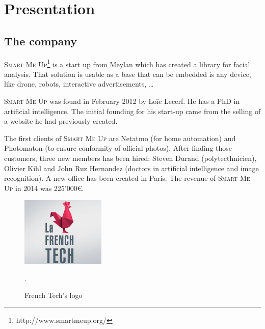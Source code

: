 \documentclass[a4paper,11pt]{custom}
\newcommand{\smu}{\textsc{Smart Me Up}\xspace}
\begin{document}
\newpage

%
\headerleftcontent{\headerlefttext}%
\headerrightcontent{\headerrighttext}%

\tableofcontents

\clearpage

\chapter{Presentation}


\section{The company}

\smu{}\footnote{http://www.smartmeup.org/} is a start up from Meylan which has
created a library for facial
analysis. That solution is usable as a base that can be embedded is any device,
like drone, robots, interactive advertisements, …

\smu{} was found in February 2012 by Loïc Lecerf. He has a PhD in artificial
intelligence. The initial founding for his start-up came from the selling of
a website he had previously created.

The first clients of \smu{} are Netatmo (for home automation) and Photomaton (to
ensure conformity of official photos). After finding those customers, three new
members has been hired: Steven Durand (polytecthnicien), Olivier Kihl and John
Ruz Hernandez (doctors in artificial intelligence and image recognition). A new
office has been created in Paris. The revenue of \smu{} in 2014 was 225'000\euro.

\begin{figure}
  \centering
  \includegraphics[width=4cm]{french-tech.jpg}
  \label{fig:frenchtech}
  \caption{French Tech's logo}.
\end{figure}
\end{document}
